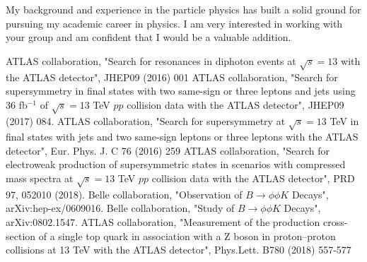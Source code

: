\documentclass[12pt]{article}
\begin{document}
My background and experience in the particle physics has built a solid ground for pursuing my academic career in physics.
I am very interested in working with your group and am confident that I would be a valuable addition.


\begin{thebibliography}{999}
 ATLAS collaboration, "Search for resonances in diphoton events at $\sqrt{s} = 13$ with the ATLAS detector", JHEP09 (2016) 001
 ATLAS collaboration, "Search for supersymmetry in final states with two same-sign or three leptons and jets using 36 fb$^{-1}$ of $\sqrt{s} = 13$ TeV $pp$ collision data with the ATLAS detector", JHEP09 (2017) 084.
 ATLAS collaboration, "Search for supersymmetry at $\sqrt{s} = 13$ TeV in final states with jets and two same-sign leptons or three leptons with the ATLAS detector", Eur. Phys. J. C 76 (2016) 259
 ATLAS collaboration, "Search for electroweak production of supersymmetric states in scenarios with compressed mass spectra at $\sqrt{s} = 13$ TeV $pp$ collision data with the ATLAS detector", PRD 97, 052010 (2018).
 Belle collaboration, "Observation of $B \to \phi \phi K$ Decays", arXiv:hep-ex/0609016.
 Belle collaboration, "Study of $B \to \phi \phi K$ Decays", arXiv:0802.1547.
ATLAS collaboration, "Measurement of the production cross-section of a single top quark in association with a Z boson in proton–proton collisions at 13 TeV with the ATLAS detector", Phys.Lett. B780 (2018) 557-577
\end{thebibliography}
\end{document}
